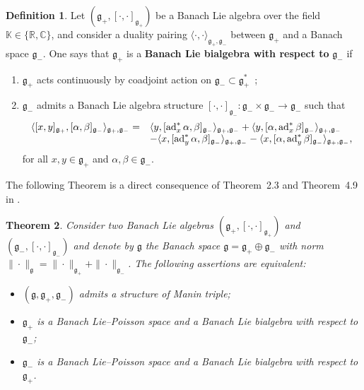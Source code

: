 \documentclass[a4paper,12pt,reqno]{amsart}%
\newtheorem{theorem}{Theorem}
\theoremstyle{definition}
\newtheorem{definition}[theorem]{Definition}
\theoremstyle{remark}
\numberwithin{theorem}{section}
\numberwithin{equation}{section}
\newcommand{\1}{{\bf 1}}
\DeclareMathOperator{\ad}{\textnormal{ad}}
\newcommand{\g}{{\mathfrak g}}
\begin{document}
\begin{definition}\label{Bialgebra_def}
Let $\left(\mathfrak{g}_+, [\cdot, \cdot]_{\g_+}\right)$ be a Banach Lie algebra over the field $\mathbb{K}\in\{\mathbb{R}, \mathbb{C}\}$, and consider a duality pairing $\langle\cdot,\cdot\rangle_{\mathfrak{g}_+, \mathfrak{g}_-}$ 
between $\mathfrak{g}_+$ and a Banach space $\mathfrak{g}_-$.  One says that $\mathfrak{g}_+$ is a \textbf{Banach Lie bialgebra with respect to} $\mathfrak{g}_-$ 
  if 
 \begin{enumerate}
 \item $\mathfrak{g}_+$ acts continuously by coadjoint action on $\mathfrak{g}_-\subset \mathfrak{g}_+^*$~; 
 \item  $\mathfrak{g}_-$ admits a Banach Lie algebra structure  $[\cdot, \cdot]_{\mathfrak{g}_-}:\mathfrak{g}_-\times\mathfrak{g}_-\rightarrow\mathfrak{g}_-$ such that
\begin{equation}\label{cocycle_mitte}
\begin{array}{ll}
\langle[x, y]_{\mathfrak{g}_+},[\alpha, \beta]_{\mathfrak{g}_-}\rangle_{\mathfrak{g}_+, \mathfrak{g}_-}
= &\langle y, [\ad^*_x\alpha, \beta]_{\mathfrak{g}_-}\rangle_{\mathfrak{g}_+, \mathfrak{g}_-} 
+ \langle y, [\alpha, \ad^*_x\beta]_{\mathfrak{g}_-}\rangle_{\mathfrak{g}_+, \mathfrak{g}_-} \\
&- \langle x, [\ad^*_y\alpha, \beta]_{\mathfrak{g}_-}\rangle_{\mathfrak{g}_+, \mathfrak{g}_-} 
- \langle x, [\alpha, \ad^*_y\beta]_{\mathfrak{g}_-} \rangle_{\mathfrak{g}_+, \mathfrak{g}_-} ,
\end{array}
\end{equation}
for all $x, y\in\g_+$ and $\alpha, \beta\in \g_-$.
   \end{enumerate} 
\end{definition}



The following Theorem is a direct consequence of Theorem~2.3 and Theorem~4.9 in \cite{tumpach-bruhat}.
\begin{theorem}\label{manin_equivalence}
Consider two Banach Lie algebras 
 $\left(\mathfrak{g}_+, [\cdot,\cdot]_{\mathfrak{g}_+}\right)$ and  $\left(\mathfrak{g}_-, [\cdot,\cdot]_{\mathfrak{g}_-}\right)$ and denote by $\mathfrak{g}$ the Banach space $\mathfrak{g} = \mathfrak{g}_+\oplus \mathfrak{g}_-$ with norm $\|\cdot\|_{\mathfrak{g}} = \|\cdot\|_{\mathfrak{g}_+}+\|\cdot\|_{\mathfrak{g}_-}$. The following assertions are equivalent:
\begin{itemize}
\item[(1)] $(\mathfrak{g}, \mathfrak{g}_+, \mathfrak{g}_-)$ admits a structure of Manin triple; 
\item[(2)] $\mathfrak{g}_+$ is a Banach Lie--Poisson space and a Banach Lie bialgebra with respect to $\mathfrak{g}_-$; 
\item[(3)] $\mathfrak{g}_-$ is a Banach Lie--Poisson space and a Banach Lie bialgebra with respect to $\mathfrak{g}_+$. 
\end{itemize}
\end{theorem}
\end{document}
